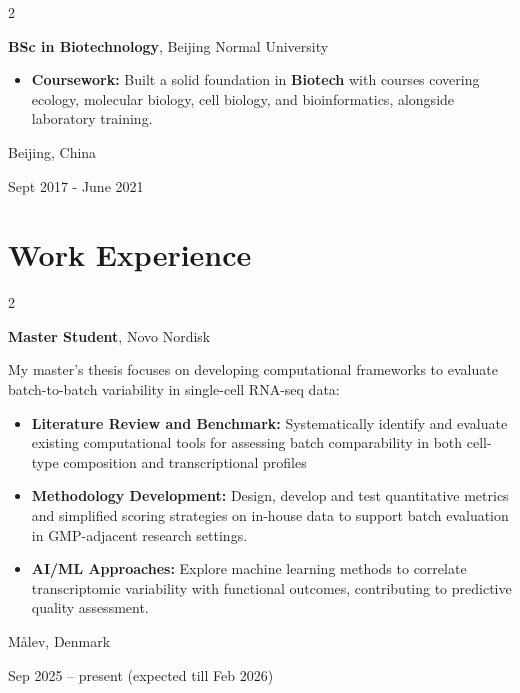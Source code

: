 \documentclass[10pt, letterpaper]{article}
\newenvironment{highlights}{
    \begin{itemize}[
        topsep=0.10 cm,
        parsep=0.10 cm,
        partopsep=0pt,
        itemsep=0pt,
        leftmargin=0.4 cm + 10pt
    ]
}{
    \end{itemize}
} %
\newenvironment{twocolentry}[2][]{
    \onecolentry
    \def\secondColumn{#2}
    \setcolumnwidth{\fill, 4.5 cm}
    \begin{paracol}{2}
}{
    \switchcolumn \raggedleft \secondColumn
    \end{paracol}
    \endonecolentry
} %
\begin{document}
        \vspace{0.3 cm}

\begin{twocolentry}{
    Beijing, China
    
    Sept 2017 - June 2021
}
    \textbf{BSc in Biotechnology}, Beijing Normal University
    \begin{highlights}
        \item \textbf{Coursework:} Built a solid foundation in \textbf{Biotech} with courses covering ecology, molecular biology, cell biology, and bioinformatics, alongside laboratory training.
    \end{highlights}
\end{twocolentry}


    
    \section{Work Experience}

        \begin{twocolentry}{
    Målev, Denmark

    Sep 2025 – present (expected till Feb 2026)
}
    \textbf{Master Student}, Novo Nordisk

    \vspace{0.1cm}
    
     My master’s thesis focuses on developing computational frameworks to evaluate batch-to-batch variability in single-cell RNA-seq data:

    \begin{highlights}
        \item \textbf{Literature Review and Benchmark:} Systematically identify and evaluate existing computational tools for assessing batch comparability in both cell-type composition and transcriptional profiles

        \vspace{0.1cm}

        \item \textbf{Methodology Development:} Design, develop and test quantitative metrics and simplified scoring strategies on in-house data to support batch evaluation in GMP-adjacent research settings.

        \vspace{0.1cm}

        \item \textbf{AI/ML Approaches:} Explore machine learning methods to correlate transcriptomic variability with functional outcomes, contributing to predictive quality assessment.


    \end{highlights}
\end{twocolentry}
\end{document}
